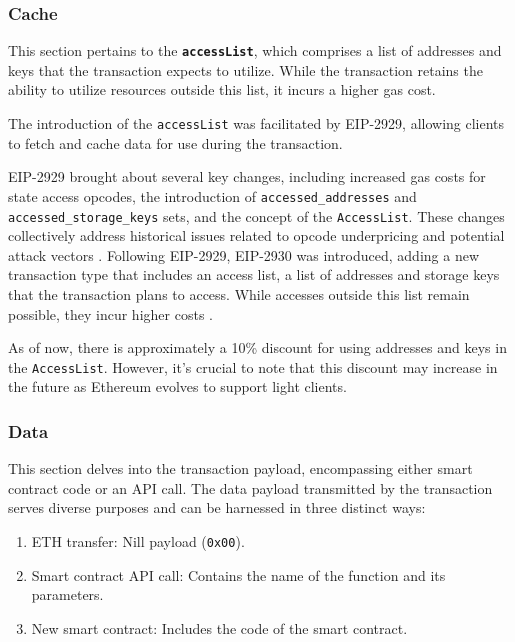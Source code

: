 \documentclass[fleqn,10pt]{olplainarticle}
\begin{document}
\subsubsection{Cache}

This section pertains to the \textbf{\texttt{accessList}}, which comprises a list of addresses and keys that the transaction expects to utilize. While the transaction retains the ability to utilize resources outside this list, it incurs a higher gas cost.

The introduction of the \texttt{accessList} was facilitated by EIP-2929, allowing clients to fetch and cache data for use during the transaction.

EIP-2929 brought about several key changes, including increased gas costs for state access opcodes, the introduction of \texttt{accessed\_addresses} and \texttt{accessed\_storage\_keys} sets, and the concept of the \texttt{AccessList}. These changes collectively address historical issues related to opcode underpricing and potential attack vectors \cite{buterin_eip2929_2020}. Following EIP-2929, EIP-2930 was introduced, adding a new transaction type that includes an access list, a list of addresses and storage keys that the transaction plans to access. While accesses outside this list remain possible, they incur higher costs \cite{buterin_eip2930_2020}.

As of now, there is approximately a 10\% discount for using addresses and keys in the \texttt{AccessList}. However, it's crucial to note that this discount may increase in the future as Ethereum evolves to support light clients.



\subsubsection{Data}

This section delves into the transaction payload, encompassing either smart contract code or an API call. The data payload transmitted by the transaction serves diverse purposes and can be harnessed in three distinct ways:
\begin{enumerate}
	\item ETH transfer: Nill payload (\texttt{0x00}).
	\item Smart contract API call: Contains the name of the function and its parameters.
	\item New smart contract: Includes the code of the smart contract.
\end{enumerate}
\end{document}
